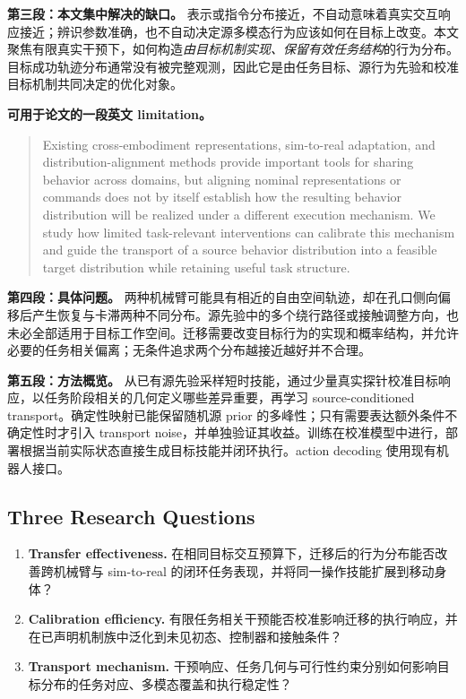 \documentclass[11pt]{article}
\begin{document}
\textbf{第三段：本文集中解决的缺口。} 表示或指令分布接近，不自动意味着真实交互响应接近；辨识参数准确，也不自动决定源多模态行为应该如何在目标上改变。本文聚焦有限真实干预下，如何构造\emph{由目标机制实现、保留有效任务结构}的行为分布。目标成功轨迹分布通常没有被完整观测，因此它是由任务目标、源行为先验和校准目标机制共同决定的优化对象。

\textbf{可用于论文的一段英文 limitation。}
\begin{quote}
\raggedright
Existing cross-embodiment representations, sim-to-real adaptation, and distribution-alignment methods provide important tools for sharing behavior across domains, but aligning nominal representations or commands does not by itself establish how the resulting behavior distribution will be realized under a different execution mechanism. We study how limited task-relevant interventions can calibrate this mechanism and guide the transport of a source behavior distribution into a feasible target distribution while retaining useful task structure.
\end{quote}

\textbf{第四段：具体问题。} 两种机械臂可能具有相近的自由空间轨迹，却在孔口侧向偏移后产生恢复与卡滞两种不同分布。源先验中的多个绕行路径或接触调整方向，也未必全部适用于目标工作空间。迁移需要改变目标行为的实现和概率结构，并允许必要的任务相关偏离；无条件追求两个分布越接近越好并不合理。

\textbf{第五段：方法概览。} 从已有源先验采样短时技能，通过少量真实探针校准目标响应，以任务阶段相关的几何定义哪些差异重要，再学习 source-conditioned transport。确定性映射已能保留随机源 prior 的多峰性；只有需要表达额外条件不确定性时才引入 transport noise，并单独验证其收益。训练在校准模型中进行，部署根据当前实际状态直接生成目标技能并闭环执行。action decoding 使用现有机器人接口。

\subsection{Three Research Questions}
\begin{enumerate}[label=\textbf{RQ\arabic*.}]
\item \textbf{Transfer effectiveness.} 在相同目标交互预算下，迁移后的行为分布能否改善跨机械臂与 sim-to-real 的闭环任务表现，并将同一操作技能扩展到移动身体？
\item \textbf{Calibration efficiency.} 有限任务相关干预能否校准影响迁移的执行响应，并在已声明机制族中泛化到未见初态、控制器和接触条件？
\item \textbf{Transport mechanism.} 干预响应、任务几何与可行性约束分别如何影响目标分布的任务对应、多模态覆盖和执行稳定性？
\end{enumerate}
\end{document}
